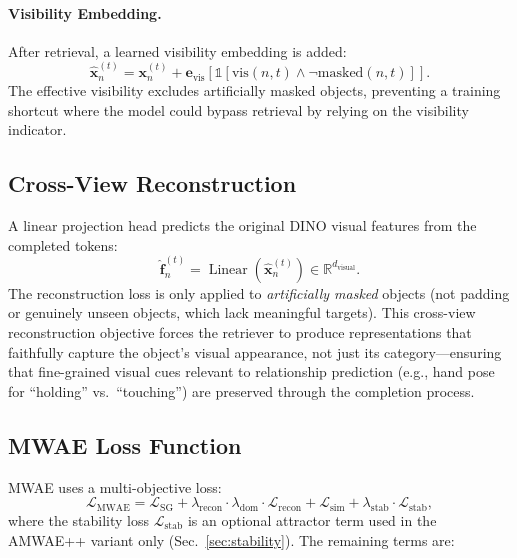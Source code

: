 \documentclass[runningheads]{llncs}
\newcommand{\mR}{\mathbb{R}}
\newcommand{\op}[1]{\operatorname{#1}}
\newcommand{\mat}[1]{\bm{#1}}
\begin{document}
\paragraph{Visibility Embedding.}  After retrieval, a learned visibility embedding is added:
\begin{equation}
    \hat{\mat{x}}_n^{(t)} = \mat{x}_n^{(t)} + \mat{e}_{\text{vis}}[\mathbb{1}[\text{vis}(n,t) \wedge \neg\text{masked}(n,t)]].
    \label{eq:mwae_vis_emb}
\end{equation}
The effective visibility excludes artificially masked objects, preventing a training shortcut where the model could bypass retrieval by relying on the visibility indicator.

\subsection{Cross-View Reconstruction}
\label{sec:recon}

A linear projection head predicts the original DINO visual features from the completed tokens:
\begin{equation}
    \hat{\mat{f}}_n^{(t)} = \op{Linear}(\hat{\mat{x}}_n^{(t)}) \in \mR^{d_{\text{visual}}}.
    \label{eq:recon_pred}
\end{equation}
The reconstruction loss is only applied to \emph{artificially masked} objects (not padding or genuinely unseen objects, which lack meaningful targets).  This cross-view reconstruction objective forces the retriever to produce representations that faithfully capture the object's visual appearance, not just its category---ensuring that fine-grained visual cues relevant to relationship prediction (e.g., hand pose for ``holding'' vs.\ ``touching'') are preserved through the completion process.

\subsection{MWAE Loss Function}
\label{sec:mwae_loss}

MWAE uses a multi-objective loss:
\begin{equation}
    \mathcal{L}_{\text{MWAE}} = \mathcal{L}_{\text{SG}} + \lambda_{\text{recon}} \cdot \lambda_{\text{dom}} \cdot \mathcal{L}_{\text{recon}} + \mathcal{L}_{\text{sim}} + \lambda_{\text{stab}} \cdot \mathcal{L}_{\text{stab}},
    \label{eq:mwae_total}
\end{equation}
where the stability loss $\mathcal{L}_{\text{stab}}$ is an optional attractor term used in the AMWAE++ variant only (Sec.~\ref{sec:stability}).  The remaining terms are:
\end{document}
